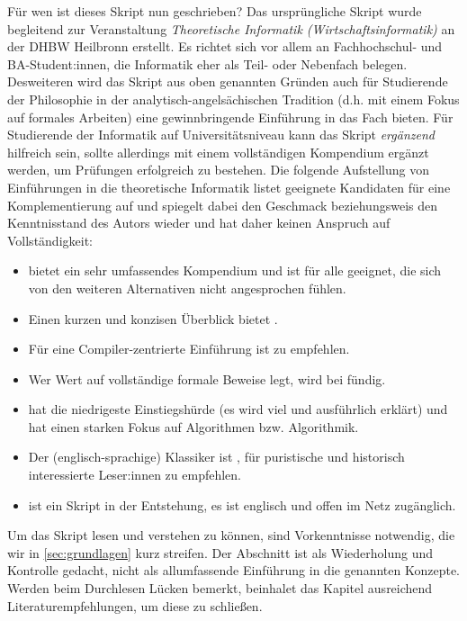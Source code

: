 Für wen ist dieses Skript nun geschrieben?
Das ursprüngliche Skript wurde begleitend zur Veranstaltung
\emph{Theoretische Informatik (Wirtschaftsinformatik)}
an der DHBW Heilbronn erstellt.
Es richtet sich vor allem an Fachhochschul- und BA-Student:innen,
die Informatik eher als Teil- oder Nebenfach belegen.
Desweiteren wird das Skript aus oben genannten Gründen auch für Studierende der Philosophie
in der analytisch-angelsächischen Tradition (d.h. mit einem Fokus auf formales Arbeiten)
eine gewinnbringende Einführung in das Fach bieten.
Für Studierende der Informatik auf Universitätsniveau kann das Skript 
\emph{ergänzend} hilfreich sein,
sollte allerdings mit einem vollständigen Kompendium ergänzt werden,
um Prüfungen erfolgreich zu bestehen.
Die folgende Aufstellung von Einführungen in die theoretische Informatik
listet geeignete Kandidaten für eine Komplementierung auf
und spiegelt dabei den Geschmack beziehungsweis den Kenntnisstand des Autors wieder
und hat daher keinen Anspruch auf Vollständigkeit:
\begin{itemize}
    \item  \cite{hoffmann} bietet ein sehr umfassendes Kompendium
            und ist für alle geeignet, die sich von den weiteren Alternativen nicht angesprochen fühlen.
    \item  Einen kurzen und konzisen Überblick bietet \cite{schoening}.
    \item  Für eine Compiler-zentrierte Einführung ist \cite{hedtstueck}
           zu empfehlen.
    \item  Wer Wert auf vollständige formale Beweise legt,
           wird bei \cite{erkpriese} fündig.
    \item  \cite{neubert} hat die niedrigeste Einstiegshürde (es wird viel und ausführlich erklärt)
           und hat einen starken Fokus auf Algorithmen bzw. Algorithmik.
    \item  Der (englisch-sprachige) Klassiker ist \cite{hopcroftullman},
           für puristische und historisch interessierte Leser:innen zu empfehlen.
    \item  \cite{barak} ist ein Skript in der Entstehung, es ist englisch und offen im Netz zugänglich.
\end{itemize}

Um das Skript lesen und verstehen zu können,
sind Vorkenntnisse notwendig,
die wir in \autoref{sec:grundlagen} kurz streifen.
Der Abschnitt ist als Wiederholung und Kontrolle gedacht,
nicht als allumfassende Einführung in die genannten Konzepte.
Werden beim Durchlesen Lücken bemerkt,
beinhalet das Kapitel ausreichend Literaturempfehlungen,
um diese zu schließen.

